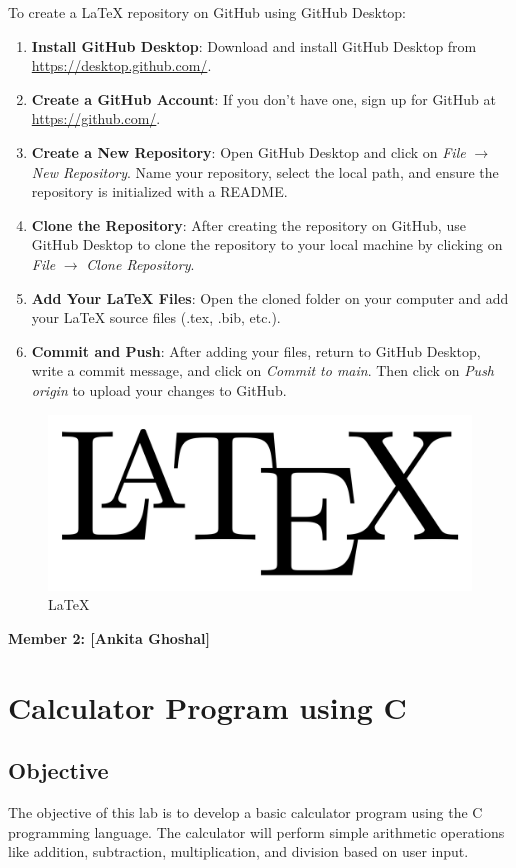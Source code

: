 \documentclass{article}
\begin{document}
\begin{center}
To create a \LaTeX{} repository on GitHub using GitHub Desktop:
\end{center}
\begin{enumerate}
    \item \textbf{Install GitHub Desktop}: Download and install GitHub Desktop from \url{https://desktop.github.com/}.
    \item \textbf{Create a GitHub Account}: If you don’t have one, sign up for GitHub at \url{https://github.com/}.
    \item \textbf{Create a New Repository}: Open GitHub Desktop and click on \textit{File} $\rightarrow$ \textit{New Repository}. Name your repository, select the local path, and ensure the repository is initialized with a README.
    \item \textbf{Clone the Repository}: After creating the repository on GitHub, use GitHub Desktop to clone the repository to your local machine by clicking on \textit{File} $\rightarrow$ \textit{Clone Repository}.
    \item \textbf{Add Your \LaTeX{} Files}: Open the cloned folder on your computer and add your \LaTeX{} source files (.tex, .bib, etc.). 
    \item \textbf{Commit and Push}: After adding your files, return to GitHub Desktop, write a commit message, and click on \textit{Commit to main}. Then click on \textit{Push origin} to upload your changes to GitHub.
\end{enumerate}
\begin{figure}[h!]
    \centering
    \includegraphics[width=0.5\linewidth]{LaTeX_logo.png}
    \caption{\LaTeX}
    
\end{figure}
\newpage
\begin{center}
    \textbf{\LARGE{{Member 2: [Ankita Ghoshal]}}}
\end{center}
\section{Calculator Program using C}
\subsection{Objective}
The objective of this lab is to develop a basic calculator program using the C programming language. The calculator will perform simple arithmetic operations like addition, subtraction, multiplication, and division based on user input.
\end{document}
